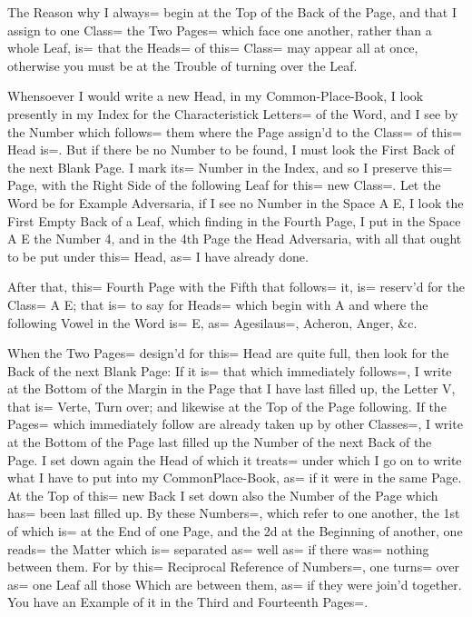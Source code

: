 The Reason why I always= begin at the Top of the Back of the Page, and that I assign to one Class= the Two Pages= which face one another, rather than a whole Leaf, is= that the Heads= of this= Class= may appear all at once, otherwise you must be at the Trouble of turning over the Leaf.

Whensoever I would write a new Head, in my Common-Place-Book, I look presently in my Index for the Characteristick Letters= of the Word, and I see by the Number which follows= them where the Page assign'd to the Class= of this= Head is=.
But if there be no Number to be found, I must look the First Back of the next Blank Page.
I mark its= Number in the Index, and so I preserve this= Page, with the Right Side of the following Leaf for this= new Class=.
Let the Word be for Example Adversaria, if I see no Number in the Space A E, I look the First Empty Back of a Leaf, which finding in the Fourth Page, I put in the Space A E the Number 4, and in the 4th Page the Head Adversaria, with all that ought to be put under this= Head, as= I have already done.

After that, this= Fourth Page with the Fifth that follows= it, is= reserv'd for the Class= A E;
that is= to say for Heads= which begin with A and where the following Vowel in the Word is= E, as= Agesilaus=, Acheron, Anger, \&c.

When the Two Pages= design'd for this= Head are quite full, then look for the Back of the next Blank Page:
If it is= that which immediately follows=, I write at the Bottom of the Margin in the Page that I have last filled up, the Letter V, that is= Verte, Turn over;
and likewise at the Top of the Page following.
If the Pages= which immediately follow are already taken up by other Classes=, I write at the Bottom of the Page last filled up the Number of the next Back of the Page.
I set down again the Head of which it treats= under which I go on to write what I have to put into my CommonPlace-Book, as= if it were in the same Page.
At the Top of this= new Back I set down also the Number of the Page which has= been last filled up.
By these Numbers=, which refer to one another, the 1st of which is= at the End of one Page, and the 2d at the Beginning of another, one reads= the Matter which is= separated as= well as= if there was= nothing between them.
For by this= Reciprocal Reference of Numbers=, one turns= over as= one Leaf all those Which are between them, as= if they were join'd together.
You have an Example of it in the Third and Fourteenth Pages=.


